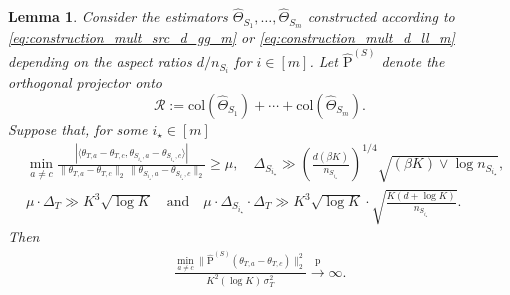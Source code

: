 \documentclass[10pt]{article}
\newtheorem{lemma}{Lemma}
\newcommand{\ip}[2]{\langle #1,#2\rangle}
\newcommand{\convp}{\xrightarrow{\mathrm{p}}}
\newcommand{\col}{\mathrm{col}}
\newcommand{\wh}{\widehat}
\newcommand{\trg}{T}
\newcommand{\sigmaT}{\sigma_{\trg}}
\newcommand{\thetamcT}[1]{\theta_{\trg,#1}}
\newcommand{\DeltaT}{\Delta_{\trg}}
\newcommand{\src}{S}
\newcommand{\nSm}[1]{n_{\src_{#1}}}
\newcommand{\thetamSS}[2]{\theta_{\src_{#1},#2}}
\newcommand{\DeltaSm}[1]{\Delta_{\src_{#1}}}
\newcommand{\hatThetaS}[1]{\wh{\Theta}_{S_{#1}}}
\newcommand{\Pest}{\wh{\mathrm P}}
\begin{document}
\begin{lemma}
\label{lem:high_dim_mult_consistent_cluster_2}
Consider the estimators
$\hatThetaS{1},\ldots,\hatThetaS{m}$
constructed according to \eqref{eq:construction_mult_src_d_gg_m} or \eqref{eq:construction_mult_d_ll_m} depending on the aspect ratios $d/\nSm{i}$ for $i \in [m]$. Let
$\Pest^{(\src)}$ denote the orthogonal projector onto
\[
\mathcal R:=\col(\hatThetaS{1})+\cdots+\col(\hatThetaS{m}).
\]
Suppose that, for some $i_\star\in[m]$
\begin{align}
\label{eq:mult_cluster_source_signal_strength_high}
&\min_{a \neq c}\frac{|\ip{\thetamcT{a}-\thetamcT{c}}{\thetamSS{i_\star}{a}-\thetamSS{i_\star}{c}}|}
    {\|\thetamcT{a}-\thetamcT{c}\|_2\,\|\thetamSS{i_\star}{a}-\thetamSS{i_\star}{c}\|_2}
    \ge \mu, \quad \DeltaSm{i_\star}\gg \left(\frac{d(\beta K)}{\nSm{i_\star}}\right)^{1/4}\sqrt{(\beta K)\vee \log\nSm{i_\star}},\\
&\mu\cdot\DeltaT \gg K^3\sqrt{\log K} \quad \text{and}\quad
\mu\cdot\DeltaSm{i_\star}\cdot\DeltaT\gg K^3\sqrt{\log K}\cdot
\sqrt{\frac{K(d+\log K)}{\nSm{i_\star}}}.
\end{align}
Then
\begin{align}
\label{eq:projected_distance_diverge}
\frac{\displaystyle \min_{a\neq c}\|\Pest^{(\src)}(\thetamcT{a}-\thetamcT{c})\|_2^2}{K^2(\log K)\,\sigmaT^2}\convp \infty.
\end{align}
\end{lemma}
\end{document}
